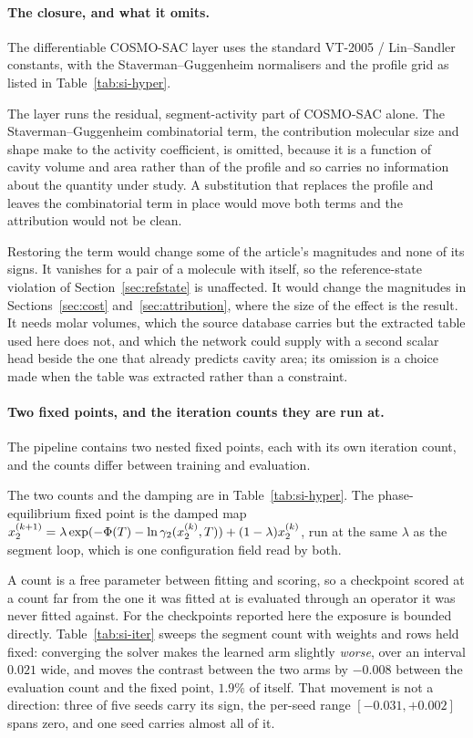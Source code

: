 \paragraph{The closure, and what it omits.}
The differentiable COSMO-SAC layer uses the standard VT-2005 / Lin--Sandler constants, with the
Staverman--Guggenheim normalisers and the profile grid as listed in Table~\ref{tab:si-hyper}.

The layer runs the residual, segment-activity part of COSMO-SAC alone. The
Staverman--Guggenheim combinatorial term, the contribution molecular size and shape make to the
activity coefficient, is omitted, because it is a function of cavity volume and area rather than of
the profile and so carries no information about the quantity under study. A substitution that
replaces the profile and leaves the combinatorial term in place would move both terms and the
attribution would not be clean.

Restoring the term would change some of the article's magnitudes and none of its signs. It vanishes
for a pair of a molecule with itself, so the reference-state violation of
Section~\ref{sec:refstate} is unaffected. It would change the magnitudes in
Sections~\ref{sec:cost} and~\ref{sec:attribution}, where the size of the effect is the result. It
needs molar volumes, which the source database carries but the extracted table used here does not,
and which the network could supply with a second scalar head beside the one that already predicts
cavity area; its omission is a choice made when the table was extracted rather than a constraint.

\paragraph{Two fixed points, and the iteration counts they are run at.}
The pipeline contains two nested fixed points, each with its own iteration count, and the counts
differ between training and evaluation.

The two counts and the damping are in Table~\ref{tab:si-hyper}. The phase-equilibrium fixed point
is the damped map
$x_2^{(k+1)}=\lambda\exp(-\Phi(T)-\ln\gamma_2(x_2^{(k)},T))+(1-\lambda)x_2^{(k)}$, run at the same
$\lambda$ as the segment loop, which is one configuration field read by both.

A count is a free parameter between fitting and scoring, so a checkpoint scored at a count far from
the one it was fitted at is evaluated through an operator it was never fitted against. For the
checkpoints reported here the exposure is bounded directly. Table~\ref{tab:si-iter} sweeps the
segment count with weights and rows held fixed: converging the solver makes the learned arm
slightly \emph{worse}, over an interval $0.021$ wide, and moves the contrast between the two arms
by $-0.008$ between the evaluation count and the fixed point, $1.9\%$ of itself. That movement is
not a direction: three of five seeds carry its sign, the per-seed range $[-0.031,+0.002]$ spans
zero, and one seed carries almost all of it.

